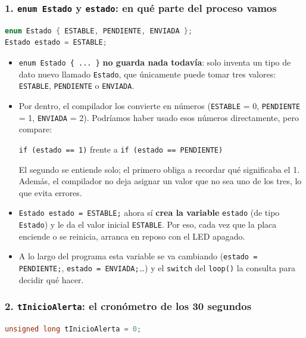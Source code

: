 \documentclass[11pt,a4paper]{article}
\begin{document}
\subsubsection*{1. \texttt{enum Estado} y \texttt{estado}: en qué parte del proceso vamos}

\begin{lstlisting}[language=C++,numbers=none]
enum Estado { ESTABLE, PENDIENTE, ENVIADA };
Estado estado = ESTABLE;
\end{lstlisting}

\begin{itemize}[leftmargin=*]
  \item \texttt{enum Estado \{ ... \}} \textbf{no guarda nada todavía}: solo inventa
        un tipo de dato nuevo llamado \texttt{Estado}, que únicamente puede tomar
        tres valores: \texttt{ESTABLE}, \texttt{PENDIENTE} o \texttt{ENVIADA}.
  \item Por dentro, el compilador los convierte en números
        (\texttt{ESTABLE} = 0, \texttt{PENDIENTE} = 1, \texttt{ENVIADA} = 2). Podríamos
        haber usado esos números directamente, pero compare:
        \begin{center}
        \texttt{if (estado == 1)} \quad frente a \quad \texttt{if (estado == PENDIENTE)}
        \end{center}
        El segundo se entiende solo; el primero obliga a recordar qué significaba
        el 1. Además, el compilador no deja asignar un valor que no sea uno de los
        tres, lo que evita errores.
  \item \texttt{Estado estado = ESTABLE;} ahora sí \textbf{crea la variable}
        \texttt{estado} (de tipo \texttt{Estado}) y le da el valor inicial
        \texttt{ESTABLE}. Por eso, cada vez que la placa enciende o se reinicia,
        arranca en reposo con el LED apagado.
  \item A lo largo del programa esta variable se va cambiando
        (\texttt{estado = PENDIENTE;}, \texttt{estado = ENVIADA;}\ldots) y el
        \texttt{switch} del \texttt{loop()} la consulta para decidir qué hacer.
\end{itemize}

\subsubsection*{2. \texttt{tInicioAlerta}: el cronómetro de los 30 segundos}

\begin{lstlisting}[language=C++,numbers=none]
unsigned long tInicioAlerta = 0;
\end{lstlisting}
\end{document}
